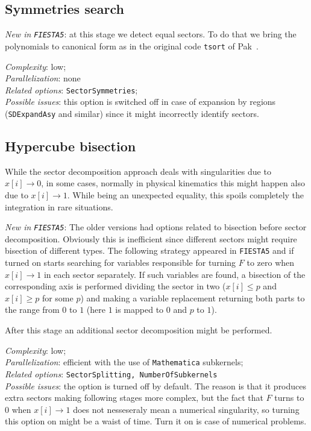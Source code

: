 \documentclass[preprint,12pt]{elsarticle}
\begin{document}
\subsection{Symmetries search}

\textit{New in {\tt FIESTA5}}: at this stage we detect equal sectors. To do that we bring the polynomials to canonical form as in the original code {\tt tsort} of Pak~\cite{Pak_2012}.

\textit{Complexity}: low;\\\indent
\textit{Parallelization}: none\\\indent
\textit{Related options}: {\tt SectorSymmetries};\\\indent
\textit{Possible issues}: this option is switched off in case of expansion by regions ({\tt SDExpandAsy} and similar) since it might incorrectly identify sectors.

\subsection{Hypercube bisection}

While the sector decomposition approach deals with singularities due to $x[i] \to 0$, in some cases, normally in physical kinematics this might happen also due to $x[i] \to 1$. While being an unexpected equality, this spoils completely the integration in rare situations. 

\textit{New in {\tt FIESTA5}}: The older versions had options related to bisection before sector decomposition. Obviously this is inefficient since different sectors might require bisection of different types. The following strategy appeared in {\tt FIESTA5} and if turned on starts searching for variables responsible for turning $F$ to zero when $x[i] \to 1$ in each sector separately. If such variables are found, a bisection of the corresponding axis is performed dividing the sector in two ($x[i] \leq p$ and $x[i] \geq p$ for some $p$) and making a variable replacement returning both parts to the range from $0$ to $1$ (here $1$ is mapped to $0$ and $p$ to $1$).

After this stage an additional sector decomposition might be performed.

\textit{Complexity}: low;\\\indent
\textit{Parallelization}: efficient with the use of {\tt Mathematica} subkernels;\\\indent
\textit{Related options}: {\tt SectorSplitting, NumberOfSubkernels}\\\indent
\textit{Possible issues}: the option is turned off by default. The reason is that it produces extra sectors making following stages more complex, but the fact that $F$ turns to $0$ when $x[i] \to 1$ does not nesseseraly mean a numerical singularity, so turning this option on might be a waist of time. Turn it on is case of numerical problems.
\end{document}
